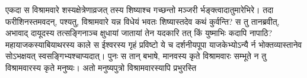 \vakya एकदा स विश्रामवारे शस्यक्षेत्रेणाव्रजत् तस्य शिष्याश्च गच्छन्तो मञ्जरी र्भङ्क्त्वादातुमारेभिरे।
\vakya तदा फरीशिनस्तमवदन्, पश्यतु, विश्रामवारे यन्न विधेयं भवतः शिष्यास्तदेव कथं कुर्वन्ति?
\vakya स तु तानब्रवीत्, अभावाद् दायूदस्य तत्सङ्गिनाञ्च क्षुधायां जातायां तेन यदकारि तत् किं युष्माभिः कदापि नापाठि?
\vakya महायाजकस्याबियाथरस्य काले स ईश्वरस्य गृहं प्रविष्टो ये च दर्शनीयपूपा याजकेभ्योऽन्यै र्न भोक्तव्यास्तानेव सोऽभक्षयत् स्वसङ्गिभ्यश्चाप्यदात्।
\vakya पुनः स तान् बभाषे, मानवस्य कृते विश्रामवारः सम्भूते न तु विश्रामवारस्य कृते मनुष्यः।
\vakya अतो मनुष्यपुत्रो विश्रामवारस्यापि प्रभुरस्ति\eoc